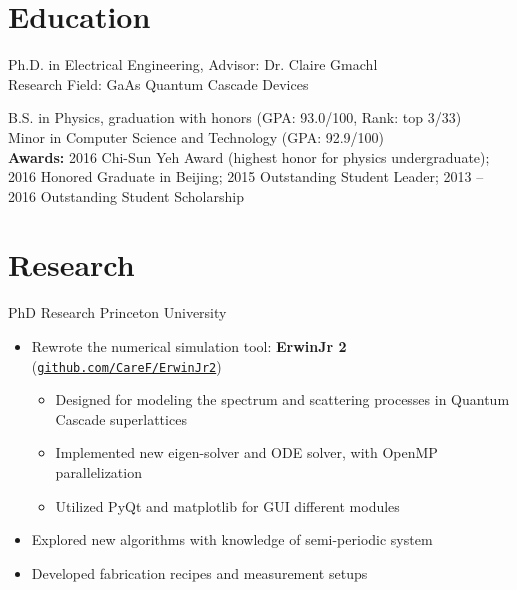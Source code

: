 \documentclass[11pt,letterpaper]{resume}
\begin{document}
\section{Education}
Ph.D. in Electrical Engineering, Advisor: Dr. Claire Gmachl \\
Research Field: GaAs Quantum Cascade Devices

B.S. in Physics, graduation with honors (GPA: 93.0/100, Rank: top 3/33)\\
Minor in Computer Science and Technology (GPA: 92.9/100)\\
\textbf{Awards:}
2016 Chi-Sun Yeh Award (highest honor for physics undergraduate); 
2016 Honored Graduate in Beijing; 
2015 Outstanding Student Leader; 
2013 -- 2016 Outstanding Student Scholarship

\section{Research}
PhD Research \hfill Princeton University
\begin{itemize}
    \item Rewrote the numerical simulation tool:
    \textbf{ErwinJr 2}
    (\href{https://github.com/CareF/ErwinJr2}{\texttt{github.com/CareF/ErwinJr2}})
\begin{itemize}
    \item Designed for modeling the spectrum and scattering processes 
    in Quantum Cascade superlattices
    \item Implemented new eigen-solver and ODE solver, 
    with OpenMP parallelization
    \item Utilized PyQt and matplotlib for GUI
    different modules
\end{itemize}\medskip
    \item Explored new algorithms with knowledge of semi-periodic system
    \item Developed fabrication recipes and measurement setups 
\end{itemize}\medskip
\end{document}

